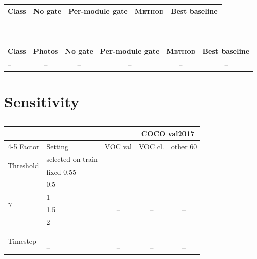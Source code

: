 \documentclass[runningheads]{llncs}
\newcommand{\method}{\textsc{Method}}          %
\newcommand{\x}{\textcolor{gray}{--}}          %
\begin{document}
\begin{table}[h]
\centering
\caption{}
\label{tab:s-perclass-voc}
\footnotesize\setlength{\tabcolsep}{2pt}
\begin{tabular}{@{}lcccc@{}}
\toprule
Class & No gate & Per-module gate & \method{} & Best baseline \\
\midrule
\x & \x & \x & \x & \x \\
\bottomrule
\end{tabular}
\end{table}

\begin{table}[h]
\centering
\caption{}
\label{tab:s-perclass-coco}
\footnotesize\setlength{\tabcolsep}{2pt}
\begin{tabular}{@{}lccccc@{}}
\toprule
Class & Photos & No gate & Per-module gate & \method{} & Best baseline \\
\midrule
\x & \x & \x & \x & \x & \x \\
\bottomrule
\end{tabular}
\end{table}

\section{Sensitivity}
\label{sec:s-sensitivity}

\begin{table}[h]
\centering
\caption{}
\label{tab:s-sensitivity}
\footnotesize\setlength{\tabcolsep}{3pt}
\begin{tabular}{@{}llccc@{}}
\toprule
 & & & \multicolumn{2}{c}{COCO val2017} \\
\cmidrule(lr){4-5}
Factor & Setting & VOC val & VOC cl. & other 60 \\
\midrule
\multirow{2}{*}{Threshold} & selected on train & \x & \x & \x \\
                           & fixed 0.55        & \x & \x & \x \\
\midrule
\multirow{4}{*}{$\gamma$}  & 0.5 & \x & \x & \x \\
                           & 1   & \x & \x & \x \\
                           & 1.5 & \x & \x & \x \\
                           & 2   & \x & \x & \x \\
\midrule
\multirow{2}{*}{Timestep}  & \x  & \x & \x & \x \\
                           & \x  & \x & \x & \x \\
\bottomrule
\end{tabular}
\end{table}
\end{document}
